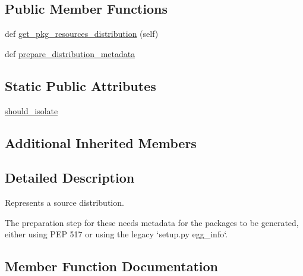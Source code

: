 \subsection*{Public Member Functions}
\begin{DoxyCompactItemize}
\item 
def \hyperlink{classpip_1_1__internal_1_1distributions_1_1sdist_1_1SourceDistribution_afa4f14436a3fbce9617bf122742e9be4}{get\+\_\+pkg\+\_\+resources\+\_\+distribution} (self)
\item 
def \hyperlink{classpip_1_1__internal_1_1distributions_1_1sdist_1_1SourceDistribution_a46c53bd349a385e9937cfb41fc005363}{prepare\+\_\+distribution\+\_\+metadata}
\end{DoxyCompactItemize}
\subsection*{Static Public Attributes}
\begin{DoxyCompactItemize}
\item 
\hyperlink{classpip_1_1__internal_1_1distributions_1_1sdist_1_1SourceDistribution_a3d90c2c598a604957eb802a6c2c50e3f}{should\+\_\+isolate}
\end{DoxyCompactItemize}
\subsection*{Additional Inherited Members}


\subsection{Detailed Description}
\begin{DoxyVerb}Represents a source distribution.

The preparation step for these needs metadata for the packages to be
generated, either using PEP 517 or using the legacy `setup.py egg_info`.
\end{DoxyVerb}
 

\subsection{Member Function Documentation}
\mbox{\label{classpip_1_1__internal_1_1distributions_1_1sdist_1_1SourceDistribution_afa4f14436a3fbce9617bf122742e9be4}} 
